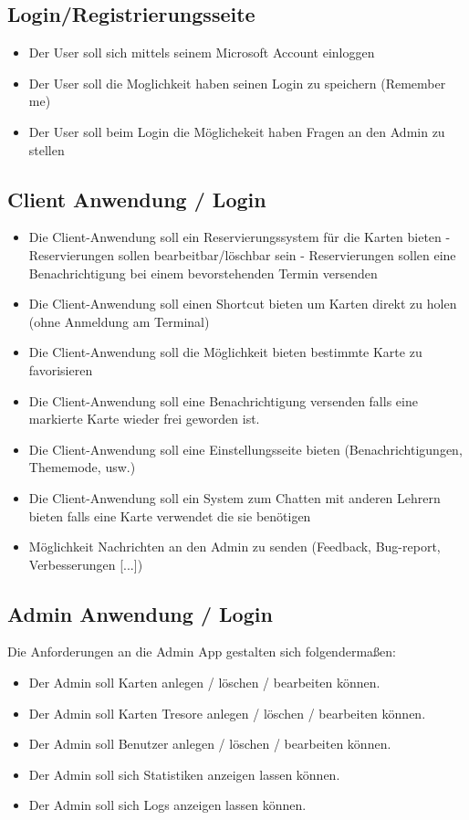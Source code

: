 \subsection{Login/Registrierungsseite}
\begin{itemize}
  \item Der User soll sich mittels seinem Microsoft Account einloggen
  \item Der User soll die Moglichkeit haben seinen Login zu speichern (Remember me)
    \item Der User soll beim Login die Möglichekeit haben Fragen an den Admin zu stellen

\end{itemize}

\subsection{Client Anwendung / Login}
\begin{itemize}
    \item Die Client-Anwendung soll ein Reservierungssystem f\"ur die Karten bieten
    \subitem - Reservierungen sollen bearbeitbar/l\"oschbar sein
    \subitem - Reservierungen sollen eine Benachrichtigung bei einem bevorstehenden Termin versenden
    \item Die Client-Anwendung soll einen Shortcut bieten um Karten direkt zu holen (ohne Anmeldung am Terminal)
    \item Die Client-Anwendung soll die Möglichkeit bieten bestimmte Karte zu favorisieren 
    \item Die Client-Anwendung soll eine Benachrichtigung versenden falls eine markierte Karte wieder frei geworden ist.
    \item Die Client-Anwendung soll eine Einstellungsseite bieten (Benachrichtigungen, Thememode, usw.)
    \item Die Client-Anwendung soll ein System zum Chatten mit anderen Lehrern bieten falls eine Karte verwendet die sie benötigen
      \item Möglichkeit Nachrichten an den Admin zu senden (Feedback, Bug-report, Verbesserungen [...])
\end{itemize}

\subsection{Admin Anwendung / Login}
Die Anforderungen an die Admin App gestalten sich folgendermaßen:
\begin{itemize}
  \item Der Admin soll Karten anlegen / löschen / bearbeiten können.
  \item Der Admin soll Karten Tresore anlegen / löschen / bearbeiten können.
  \item Der Admin soll Benutzer anlegen / löschen / bearbeiten können.
  \item Der Admin soll sich Statistiken anzeigen lassen können.
  \item Der Admin soll sich Logs anzeigen lassen können.
\end{itemize}

